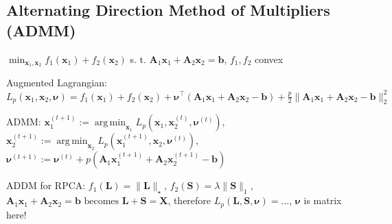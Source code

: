 \documentclass[a4paper, 11pt, landscape]{article}
\DeclareMathOperator*{\argmin}{arg\,min}
\begin{document}
\begin{multicols*}{3}
    \subsection{Alternating Direction Method of Multipliers (ADMM)}
    $\min_{\mathbf{x}_1, \mathbf{x}_2} f_1(\mathbf{x}_1) + f_2(\mathbf{x}_2)$ s. t. $\mathbf{A}_1 \mathbf{x}_1 + \mathbf{A}_2 \mathbf{x}_2 = \mathbf{b}$, $f_1, f_2$ convex
    \begin{inparaitem}[\color{red}\textbullet]
    \item Augmented Lagrangian: $L_p(\mathbf{x}_1, \mathbf{x}_2, \boldsymbol{\nu}) = f_1(\mathbf{x}_1) + f_2(\mathbf{x}_2) + \boldsymbol{\nu}^\top (\mathbf{A}_1 \mathbf{x}_1 + \mathbf{A}_2 \mathbf{x}_2 - \mathbf{b}) + \frac{p}{2}\| \mathbf{A}_1 \mathbf{x}_1 + \mathbf{A}_2 \mathbf{x}_2 - \mathbf{b} \|_2^2$
    \item ADMM: $\mathbf{x}_1^{(t+1)} := \argmin_{\mathbf{x}_1} L_p(\mathbf{x}_1, \mathbf{x}_2^{(t)}, \boldsymbol{\nu}^{(t)})$, $\mathbf{x}_2^{(t+1)} := \argmin_{\mathbf{x}_2} L_p(\mathbf{x}_1^{(t+1)}, \mathbf{x}_2, \boldsymbol{\nu}^{(t)})$, $\boldsymbol{\nu}^{(t+1)} := \boldsymbol{\nu}^{(t)} + p(\mathbf{A}_1 \mathbf{x}_1^{(t+1)} + \mathbf{A}_2 \mathbf{x}_2^{(t+1)} - \mathbf{b})$
    \item ADDM for RPCA: $f_1(\mathbf{L}) = \|\mathbf{L}\|_\star$, $f_2(\mathbf{S}) = \lambda \| \mathbf{S} \|_1$, $\mathbf{A}_1 \mathbf{x}_1 + \mathbf{A}_2 \mathbf{x}_2 = \mathbf{b} \text{ becomes } \mathbf{L} + \mathbf{S} = \mathbf{X}$, therefore $L_p(\mathbf{L}, \mathbf{S}, \boldsymbol{\nu}) = \ldots$, $\boldsymbol{\nu}$ is matrix here!
    \end{inparaitem}

    \raggedcolumns
\end{multicols*}
\end{document}
